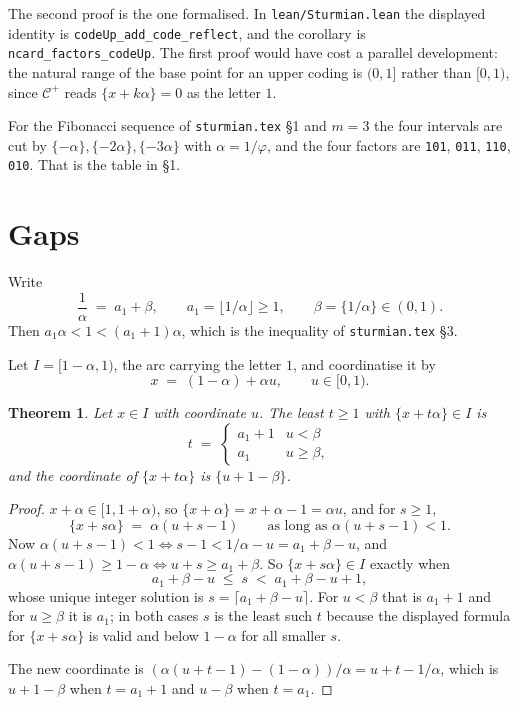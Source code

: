 \documentclass[11pt,a4paper]{article}
\newcommand{\seq}[1]{\texttt{\small #1}}
\newcommand{\Cp}{\mathcal{C}^{+}}
\theoremstyle{definition}
\theoremstyle{plain}
\newtheorem{theorem}[definition]{Theorem}
\begin{document}
The second proof is the one formalised. In \texttt{lean/Sturmian.lean} the
displayed identity is
\texttt{codeUp\_add\_code\_reflect}, and the corollary is
\texttt{ncard\_factors\_codeUp}. The first proof would have cost a parallel
development: the natural range of the base point for
an upper coding is $(0,1]$ rather than $[0,1)$, since $\Cp$ reads
$\{x+k\alpha\} = 0$ as the letter $1$.

For the Fibonacci sequence of \texttt{sturmian.tex} \S1 and $m = 3$ the four
intervals are cut by $\{-\alpha\}, \{-2\alpha\}, \{-3\alpha\}$ with
$\alpha = 1/\varphi$, and the four factors are \seq{101}, \seq{011}, \seq{110},
\seq{010}. That is the table in \S1.

\section{Gaps}

Write
\[
  \frac{1}{\alpha} \;=\; a_1 + \beta, \qquad a_1 = \lfloor 1/\alpha\rfloor \geq 1,
  \qquad \beta = \{1/\alpha\} \in (0,1) .
\]
Then $a_1 \alpha < 1 < (a_1+1)\alpha$, which is the inequality of
\texttt{sturmian.tex} \S3.

Let $I = [1-\alpha, 1)$, the arc carrying the letter $1$, and coordinatise it by
\[
  x \;=\; (1-\alpha) + \alpha u , \qquad u \in [0,1) .
\]

\begin{theorem}\label{thm:return}
Let $x \in I$ with coordinate $u$. The least $t \geq 1$ with
$\{x + t\alpha\} \in I$ is
\[
  t \;=\; \begin{cases} a_1 + 1 & u < \beta \\ a_1 & u \geq \beta, \end{cases}
\]
and the coordinate of $\{x+t\alpha\}$ is $\{u + 1 - \beta\}$.
\end{theorem}

\begin{proof}
$x + \alpha \in [1, 1+\alpha)$, so $\{x+\alpha\} = x + \alpha - 1 = \alpha u$,
and for $s \geq 1$,
\[
  \{x + s\alpha\} \;=\; \alpha(u + s - 1)
  \qquad\text{as long as } \alpha(u+s-1) < 1 .
\]
Now $\alpha(u+s-1) < 1 \iff s - 1 < 1/\alpha - u = a_1 + \beta - u$, and
$\alpha(u+s-1) \geq 1-\alpha \iff u + s \geq a_1 + \beta$. So
$\{x+s\alpha\} \in I$ exactly when
\[
  a_1 + \beta - u \;\leq\; s \;<\; a_1 + \beta - u + 1 ,
\]
whose unique integer solution is $s = \lceil a_1 + \beta - u\rceil$. For
$u < \beta$ that is $a_1+1$ and for $u \geq \beta$ it is $a_1$; in both cases
$s$ is the least such $t$ because the displayed formula for
$\{x+s\alpha\}$ is valid and below $1-\alpha$ for all smaller $s$.

The new coordinate is $(\alpha(u+t-1) - (1-\alpha))/\alpha = u + t - 1/\alpha$,
which is $u+1-\beta$ when $t = a_1+1$ and $u - \beta$ when $t = a_1$.
\end{proof}
\end{document}
